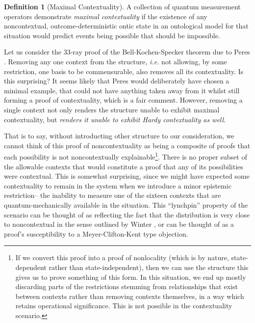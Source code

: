 \documentclass{amsart}
\theoremstyle{definition}
\newtheorem{defn}{Definition}
\begin{document}
\begin{defn}[Maximal Contextuality]
A collection of quantum measurement operators demonstrate \emph{maximal contextuality} if the existence of any noncontextual, outcome-deterministic ontic state in an ontological model for that situation would predict events being possible that should be impossible. %
\end{defn}


Let us consider the 33-ray proof of the Bell-Kochen-Specker theorem due to Peres \cite{Pere1991}. Removing any one context from the structure, \emph{i.e.} not allowing, by some restriction, one basis to be commensurable, also removes all its contextuality. Is this surprising? It seems likely that Peres would deliberately have chosen a minimal example, that could not have anything taken away from it whilst still forming a proof of contextuality, which is a fair comment. However, removing a single context not only renders the structure unable to exhibit maximal contextuality, but \emph{renders it unable to exhibit Hardy contextuality as well}.

That is to say, without introducting other structure to our consideration, we cannot think of this proof of noncontextuality as being a composite of proofs that each possibility is not noncontextually explainable\footnote{If we convert this proof into a proof of nonlocality (which is by nature, state-dependent rather than state-independent), then we can use the structure this gives us to prove something of this form. In this situation, we end up mostly %
discarding parts of the restrictions stemming from relationships that exist between contexts rather than removing contexts themselves, in a way which retains operational significance. This is not possible in the contextuality scenario.}. There is no proper subset of the allowable contexts that would constitute a proof that any of its possibilities were contextual. This is somewhat surprising, since we might have expected some contextuality to remain in the system when we introduce a minor epistemic restriction-- the inability to measure one of the sixteen contexts that are quantum-mechanically available in the situation. This ``lynchpin'' property of the scenario can be thought of as reflecting the fact that the distribution is very close to noncontextual in the sense outlined by Winter \cite{Wint2014}, or can be thought of as a proof's susceptibility to a Meyer-Clifton-Kent type objection.
\end{document}
